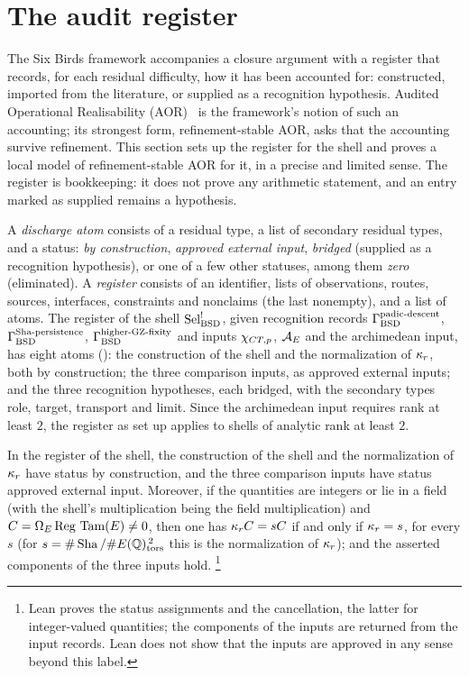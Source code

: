 \section{The audit register}
\label{sec:aor-instance}

The Six Birds framework accompanies a closure argument with a register
that records, for each residual difficulty, how it has been accounted for:
constructed, imported from the literature, or supplied as a recognition
hypothesis.  Audited Operational Realisability (AOR)~\citep{TsiokosAOR2026} is the
framework's notion of such an accounting; its strongest form,
refinement-stable AOR, asks that the accounting survive refinement.  This
section sets up the register for the shell and proves a local model of
refinement-stable AOR for it, in a precise and limited sense.  The register is bookkeeping: it does not prove any
arithmetic statement, and an entry marked as supplied remains a
hypothesis.

\begin{definition}\label{def:closure:aor-sel-instance}
A \emph{discharge atom} consists of a residual type, a list of secondary
residual types, and a status: \emph{by construction}, \emph{approved
external input}, \emph{bridged} (supplied as a recognition hypothesis),
or one of a few other statuses, among them \emph{zero} (eliminated).  A
\emph{register} consists of an identifier, lists of observations, routes,
sources, interfaces, constraints and nonclaims (the last nonempty), and a
list of atoms.  The register of the shell $\mathrm{Sel}^{!}_{\mathrm{BSD}}$, given recognition
records $\Gamma_{\mathrm{BSD}}^{\mathrm{padic\text{-}descent}}$, $\Gamma_{\mathrm{BSD}}^{\mathrm{Sha\text{-}persistence}}$, $\Gamma_{\mathrm{BSD}}^{\mathrm{higher\text{-}GZ\text{-}fixity}}$ and inputs $\chi_{CT,p}$, $\mathcal{A}_E$
and the archimedean input, has eight atoms ():
the construction of the shell and the normalization of $\kappa_r$, both by
construction; the three comparison inputs, as approved external inputs;
and the three recognition hypotheses, each bridged, with the secondary
types role, target, transport and limit.  Since the archimedean input
requires rank at least $2$, the register as set up applies to shells of
analytic rank at least $2$.
\end{definition}



\begin{theorem}\label{thm:closure:aor-mechanical-records}
In the register of the shell, the construction of the shell and the
normalization of $\kappa_r$ have status by construction, and the three
comparison inputs have status approved external input.  Moreover, if the
quantities are integers or lie in a field (with the shell's multiplication
being the field multiplication) and $C=\Omega_E\operatorname{Reg}\,\operatorname{Tam}(E)\neq0$, then
one has $\kappa_r C=sC$ if and only if
$\kappa_r=s$, for every $s$ (for $s=\#\operatorname{Sha}/\#E(\mathbb{Q})_{\operatorname{tors}}^{\,2}$ this is
the normalization of $\kappa_r$); and the asserted components of the three
inputs hold.%
\footnote{Lean proves the status assignments and the cancellation, the
latter for integer-valued quantities; the components of the inputs are
returned from the input records.  Lean does not show that the inputs are
approved in any sense beyond this label.}
\end{theorem}

